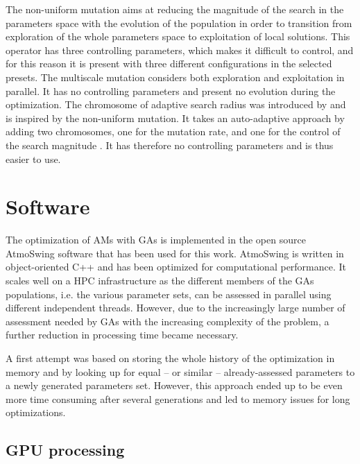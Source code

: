 \documentclass[draft]{agujournal2019}
\begin{document}
The non-uniform mutation \cite{Michalewicz1996} aims at reducing the magnitude of the search in the parameters space with the evolution of the population in order to transition from exploration of the whole parameters space to exploitation of local solutions. This operator has three controlling parameters, which makes it difficult to control, and for this reason it is present with three different configurations in the selected presets. The multiscale mutation considers both exploration and exploitation in parallel. It has no controlling parameters and present no evolution during the optimization. The chromosome of adaptive search radius was introduced by  and is inspired by the non-uniform mutation. It takes an auto-adaptive approach by adding two chromosomes, one for the mutation rate, and one for the control of the search magnitude \cite<see details in>{Horton2017a}. It has therefore no controlling parameters and is thus easier to use. 


\section{Software}
\label{software}

The optimization of AMs with GAs is implemented in the open source AtmoSwing software \cite{Horton2019} that has been used for this work. AtmoSwing is written in object-oriented C++ and has been optimized for computational performance. It scales well on a HPC infrastructure as the different members of the GAs populations, i.e. the various parameter sets, can be assessed in parallel using different independent threads. However, due to the increasingly large number of assessment needed by GAs with the increasing complexity of the problem, a further reduction in processing time became necessary. 

A first attempt was based on storing the whole history of the optimization in memory and by looking up for equal -- or similar -- already-assessed parameters to a newly generated parameters set. However, this approach ended up to be even more time consuming after several generations and led to memory issues for long optimizations.



\subsection{GPU processing}
\end{document}
